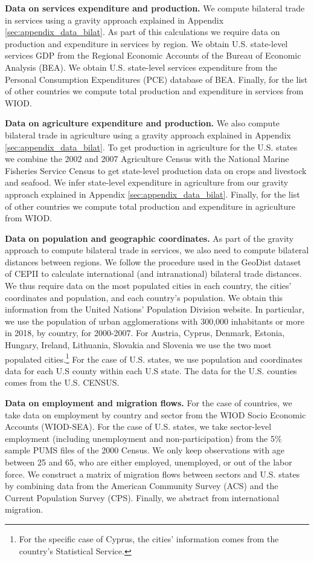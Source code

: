 \documentclass[12pt]{article}
\begin{document}
\textbf{Data on services expenditure and production.} We compute bilateral trade in services using a gravity approach explained in Appendix \ref{sec:appendix_data_bilat}. As part of this calculations we require data on production and expenditure in services by region. We obtain U.S. state-level services GDP from the Regional Economic Accounts of the Bureau of Economic Analysis (BEA). We obtain U.S. state-level services expenditure from the Personal Consumption Expenditures (PCE) database of BEA. Finally, for the list of other countries we compute total production and expenditure in services from WIOD.

\textbf{Data on agriculture expenditure and production.}  We also compute bilateral trade in agriculture using a gravity approach explained in Appendix \ref{sec:appendix_data_bilat}. To get production in agriculture for the U.S. states we combine the 2002 and 2007 Agriculture Census with the National Marine Fisheries Service Census to get state-level production data on crops and livestock and seafood. We infer state-level expenditure in agriculture from our gravity approach explained in Appendix \ref{sec:appendix_data_bilat}. Finally, for the list of other countries we compute total production and expenditure in agriculture from WIOD. 

\textbf{Data on population and geographic coordinates.} As part of the gravity approach to compute bilateral trade in services, we also need to compute bilateral distances between regions. We follow the procedure used in the GeoDist dataset of CEPII to calculate international (and intranational) bilateral trade distances. We thus require data on the most populated cities in each country, the cities' coordinates and population, and each country's population. We obtain this information from the United Nations' Population Division website. In particular, we use the population of urban agglomerations with 300,000 inhabitants or more in 2018, by country, for 2000-2007. For Austria, Cyprus, Denmark, Estonia, Hungary, Ireland, Lithuania, Slovakia and Slovenia we use the two most populated cities.\footnote{For the specific case of Cyprus, the cities' information comes from the country's Statistical Service.} For the case of U.S. states, we use population and coordinates data for each U.S county within each U.S state. The data for the U.S. counties comes from the U.S. CENSUS. 

\textbf{Data on employment and migration flows.} For the case of countries, we take data on employment by country and sector from the WIOD Socio Economic Accounts (WIOD-SEA). For the case of U.S. states, we take sector-level employment (including unemployment and non-participation) from the 5\% sample PUMS files of the 2000 Census. We only keep observations with age between 25 and 65, who are either employed, unemployed, or out of the labor force. We construct a matrix of migration flows between sectors and U.S. states by combining data from the American Community Survey (ACS) and the Current Population Survey (CPS). Finally, we abstract from international migration.
\end{document}
